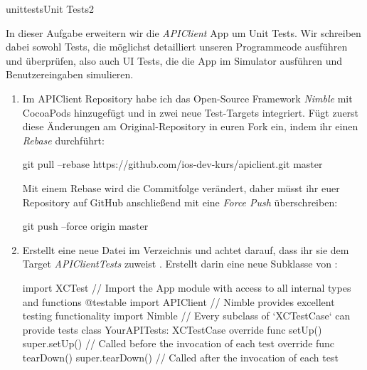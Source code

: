 \documentclass[parskip=half, final]{scrreprt}
\begin{document}
\begin{lecture}
\begin{exc}
\begin{excitem}{unittests}{Unit Tests}{2}

In dieser Aufgabe erweitern wir die \emph{APIClient} App um Unit Tests. Wir schreiben dabei sowohl Tests, die möglichst detailliert unseren Programmcode ausführen und überprüfen, also auch UI Tests, die die App im Simulator ausführen und Benutzereingaben simulieren.

\begin{enumerate}[label=\arabic*.]
\item Im APIClient Repository  habe ich das Open-Source Framework \emph{Nimble} mit CocoaPods hinzugefügt und in zwei neue Test-Targets integriert. Fügt zuerst diese Änderungen am Original-Repository in euren Fork ein, indem ihr einen \emph{Rebase} durchführt:
\begin{shcode}
git pull --rebase https://github.com/ios-dev-kurs/apiclient.git master
\end{shcode}
Mit einem Rebase wird die Commitfolge verändert, daher müsst ihr euer Repository auf GitHub anschließend mit eine \emph{Force Push} überschreiben:
\begin{shcode}
git push --force origin master
\end{shcode}
\item Erstellt eine neue Datei  im  Verzeichnis und achtet darauf, dass ihr sie dem Target \emph{APIClientTests} zuweist . Erstellt darin eine neue Subklasse von :
\begin{swiftcode}
import XCTest
// Import the App module with access to all internal types and functions
@testable import APIClient
// Nimble provides excellent testing functionality
import Nimble
// Every subclass of `XCTestCase` can provide tests
class YourAPITests: XCTestCase {
    override func setUp() {
        super.setUp()
        // Called before the invocation of each test
    }
    override func tearDown() {
        super.tearDown()
        // Called after the invocation of each test
    }
}
\end{swiftcode}



\end{enumerate}
\end{excitem}
\end{exc}
\end{lecture}
\end{document}
